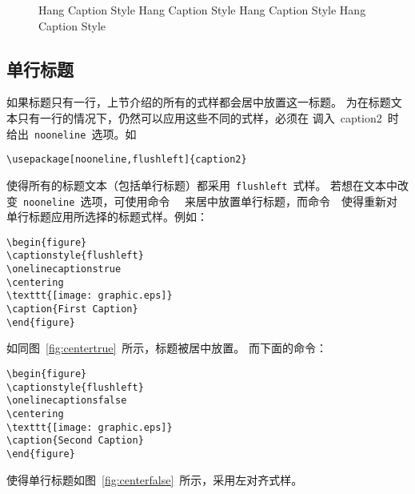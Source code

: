 \begin{figure}
	\begin{minipage}[t]{.45\textwidth}
		\vspace{0pt}
		\setcaptionmargin{5pt}
		\centering
		\resizebox{4cm}{!}{\usebox{\graphic}}
		\caption{Indent Caption Style Indent Caption Style
			Indent Caption Style Indent Caption Style}\label{fig:indentcap}
	\end{minipage}%
	\begin{minipage}[t]{.45\textwidth}
		\vspace{0pt}
		\setcaptionmargin{5pt}
		\centering
		\resizebox{4cm}{!}{\usebox{\graphic}}
		\caption{Hang Caption Style Hang Caption Style
			Hang Caption Style Hang Caption Style}\label{fig:hangcap}
	\end{minipage}
\end{figure}

\subsection{单行标题}\label{ssec:onelinecaption}

如果标题只有一行，上节介绍的所有的式样都会居中放置这一标题。
为在标题文本只有一行的情况下，仍然可以应用这些不同的式样，必须在
调入~\textsf{caption2}~时给出~\texttt{nooneline}~选项。如
\begin{Verbatim}[xleftmargin=1cm]
\usepackage[nooneline,flushleft]{caption2}
\end{Verbatim}
使得所有的标题文本（包括单行标题）都采用~\texttt{flushleft}~式样。
若想在文本中改变~\texttt{nooneline}~选项，可使用命令~~
来居中放置单行标题，而命令~~使得重新对
单行标题应用所选择的标题式样。例如：
\begin{Verbatim}[xleftmargin=1cm]
\begin{figure} 
\captionstyle{flushleft} 
\onelinecaptionstrue 
\centering 
\texttt{[image: graphic.eps]} 
\caption{First Caption} 
\end{figure}
\end{Verbatim}
如同图~\ref{fig:centertrue}~所示，标题被居中放置。
而下面的命令：
\begin{Verbatim}[xleftmargin=1cm]
\begin{figure} 
\captionstyle{flushleft} 
\onelinecaptionsfalse
\centering 
\texttt{[image: graphic.eps]} 
\caption{Second Caption}
\end{figure}
\end{Verbatim}
使得单行标题如图~\ref{fig:centerfalse}~所示，采用左对齐式样。

